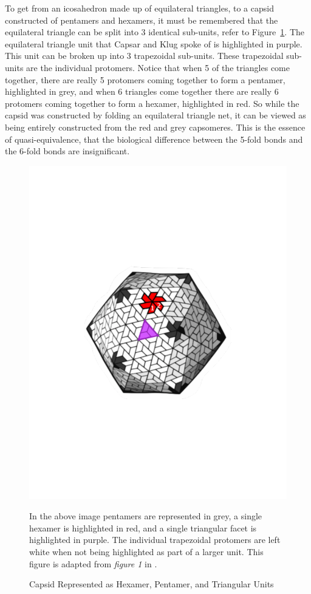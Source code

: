\documentclass[12pt,letter]{article}
\begin{document}
To get from an icosahedron made up of equilateral triangles, to a capsid constructed of pentamers and hexamers, it must be remembered that the equilateral triangle can be split into 3 identical sub-units, refer to Figure~\ref{fig:capsid_color}. The equilateral triangle unit that Capsar and Klug spoke of is highlighted in purple. This unit can be broken up into 3 trapezoidal sub-units. These trapezoidal sub-units are the individual protomers. Notice that when 5 of the triangles come together, there are really 5 protomers coming together to form a pentamer, highlighted in grey, and when 6 triangles come together there are really 6 protomers coming together to form a hexamer, highlighted in red. So while the capsid was constructed by folding an equilateral triangle net, it can be viewed as being entirely constructed from the red and grey capsomeres. This is the essence of quasi-equivalence, that the biological difference between the 5-fold bonds and the 6-fold bonds are insignificant.

\begin{figure}[t!]
	\centering
	\caption{Capsid Represented as Hexamer, Pentamer, and Triangular Units}
	\includegraphics[width = .45\textwidth]{capsid_color.pdf}
	\label{fig:capsid_color}
		\begin{minipage}[h]{.75\textwidth}
		\begin{footnotesize}
		In the above image pentamers are represented in grey, a single hexamer is highlighted in red, and a single triangular facet is highlighted in purple. The individual trapezoidal protomers are left white when not being highlighted as part of a larger unit. This figure is adapted from \textit{figure 1} in \cite{Mannige:2009}.
		\end{footnotesize}
	\end{minipage}
\end{figure}
\end{document}
